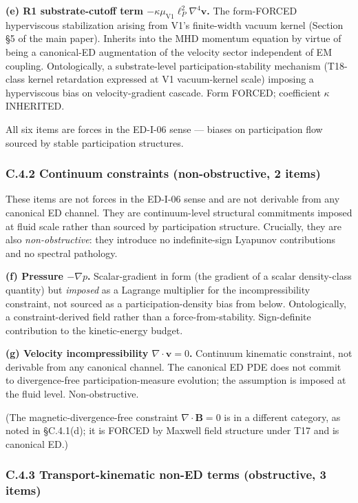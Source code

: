 \documentclass[
]{article}
\begin{document}
\textbf{(e) R1 substrate-cutoff term
\(-\kappa\mu_\mathrm{V1}\ell_P^2\nabla^4\mathbf{v}\).} The form-FORCED
hyperviscous stabilization arising from V1's finite-width vacuum kernel
(Section §5 of the main paper). Inherits into the MHD momentum equation
by virtue of being a canonical-ED augmentation of the velocity sector
independent of EM coupling. Ontologically, a substrate-level
participation-stability mechanism (T18-class kernel retardation
expressed at V1 vacuum-kernel scale) imposing a hyperviscous bias on
velocity-gradient cascade. Form FORCED; coefficient \(\kappa\)
INHERITED.

All six items are forces in the ED-I-06 sense --- biases on
participation flow sourced by stable participation structures.

\subsubsection{C.4.2 Continuum constraints (non-obstructive, 2
items)}\label{c.4.2-continuum-constraints-non-obstructive-2-items}

These items are not forces in the ED-I-06 sense and are not derivable
from any canonical ED channel. They are continuum-level structural
commitments imposed at fluid scale rather than sourced by participation
structure. Crucially, they are also \emph{non-obstructive}: they
introduce no indefinite-sign Lyapunov contributions and no spectral
pathology.

\textbf{(f) Pressure \(-\nabla p\).} Scalar-gradient in form (the
gradient of a scalar density-class quantity) but \emph{imposed} as a
Lagrange multiplier for the incompressibility constraint, not sourced as
a participation-density bias from below. Ontologically, a
constraint-derived field rather than a force-from-stability.
Sign-definite contribution to the kinetic-energy budget.

\textbf{(g) Velocity incompressibility \(\nabla\cdot\mathbf{v} = 0\).}
Continuum kinematic constraint, not derivable from any canonical
channel. The canonical ED PDE does not commit to divergence-free
participation-measure evolution; the assumption is imposed at the fluid
level. Non-obstructive.

(The magnetic-divergence-free constraint \(\nabla\cdot\mathbf{B} = 0\)
is in a different category, as noted in §C.4.1(d); it is FORCED by
Maxwell field structure under T17 and is canonical ED.)

\subsubsection{C.4.3 Transport-kinematic non-ED terms (obstructive, 3
items)}\label{c.4.3-transport-kinematic-non-ed-terms-obstructive-3-items}
\end{document}
